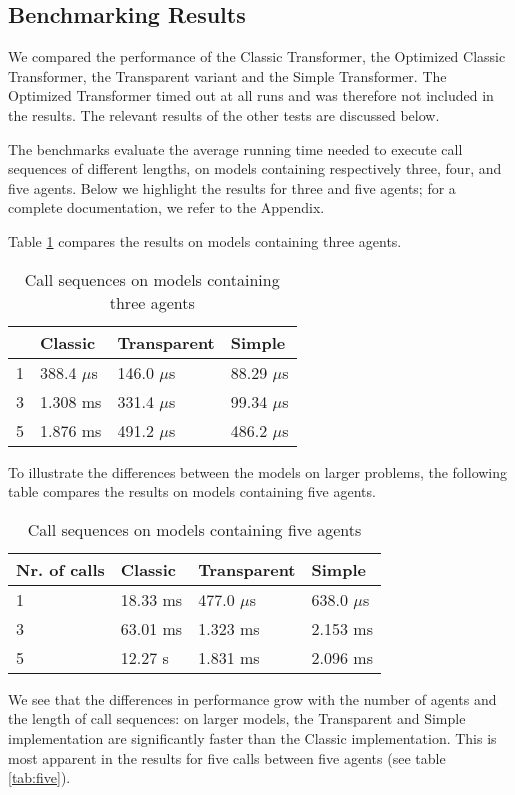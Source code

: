 \subsection{Benchmarking Results}

We compared the performance of the Classic Transformer, the Optimized Classic Transformer, the Transparent variant and the Simple Transformer. The Optimized Transformer timed out at all runs and was therefore not included in the results. The relevant results of the other tests are discussed below.

The benchmarks evaluate the average running time needed to execute call sequences of different lengths, on models containing respectively three, four, and five agents. Below we highlight the results for three and five agents; for a complete documentation, we refer to the Appendix.

Table \ref{tab:three} compares the results on models containing three agents.

\begin{table}[H]
\caption {Call sequences on models containing three agents} \label{tab:three}
\begin{center}
\begin{tabular}{l|lll}
\title
Nr. of calls & Classic      & Transparent  & Simple       \\ \hline
1            & 388.4 $\mu$s & 146.0 $\mu$s & 88.29 $\mu$s \\
3            & 1.308 ms     & 331.4 $\mu$s & 99.34 $\mu$s \\
5            & 1.876 ms     & 491.2 $\mu$s & 486.2 $\mu$s
\end{tabular}
\end{center}
\end{table}

To illustrate the differences between the models on larger problems, the following table compares the results on models containing five agents.

\begin{table}[H]
\caption {Call sequences on models containing five agents} \label{tab:five}
\begin{center}
\begin{tabular}{l|lll}\label{tab:2}
    Nr. of calls & Classic  & Transparent  & Simple       \\ \hline
    1            & 18.33 ms & 477.0 $\mu$s & 638.0 $\mu$s \\
    3            & 63.01 ms & 1.323 ms     & 2.153 ms     \\
    5            & 12.27 s  & 1.831 ms     & 2.096 ms
\end{tabular}
\end{center}
\end{table}

We see that the differences in performance grow with the number of agents and the length of call sequences:
on larger models, the Transparent and Simple implementation are significantly faster than the Classic implementation.
This is most apparent in the results for five calls between five agents (see table \ref{tab:five}).
